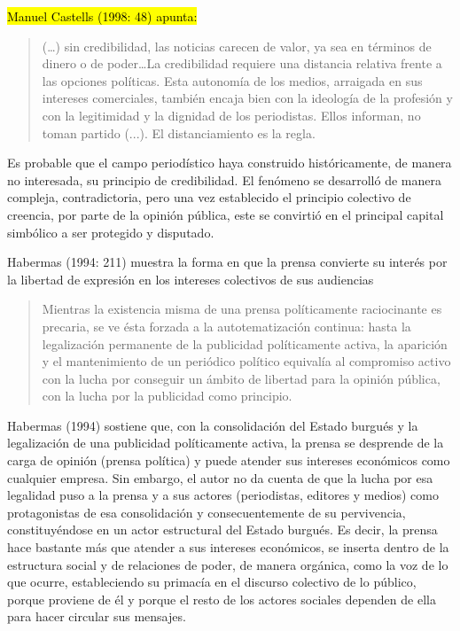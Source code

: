 %
%

\hl{Manuel Castells (1998: 48) apunta:}

\begin{quote}
(\ldots) sin credibilidad, las noticias carecen de valor, ya sea en términos de dinero o de poder\ldots La credibilidad requiere una distancia relativa frente a las opciones políticas. Esta autonomía de los medios, arraigada en sus intereses comerciales, también encaja bien con la ideología de la profesión y con la legitimidad y la dignidad de los periodistas. Ellos informan, no toman partido (...). El distanciamiento es la regla.
\end{quote}

Es probable que el campo periodístico haya construido históricamente, de manera no interesada, su principio de credibilidad. El fenómeno se desarrolló de manera compleja, contradictoria, pero una vez establecido el principio colectivo de creencia, por parte de la opinión pública, este se convirtió en el principal capital simbólico a ser protegido y disputado.

Habermas (1994: 211) muestra la forma en que la prensa convierte su interés por la libertad de expresión en los intereses colectivos de sus audiencias

\begin{quote}
Mientras la existencia misma de una prensa políticamente raciocinante es precaria, se ve ésta forzada a la autotematización continua: hasta la legalización permanente de la publicidad políticamente activa, la aparición y el mantenimiento de un periódico político equivalía al compromiso activo con la lucha por conseguir un ámbito de libertad para la opinión pública, con la lucha por la publicidad como principio.
\end{quote}

Habermas (1994) sostiene que, con la consolidación del Estado burgués y la legalización de una publicidad políticamente activa, la prensa se desprende de la carga de opinión (prensa política) y puede atender sus intereses económicos como cualquier empresa. Sin embargo, el autor no da cuenta de que la lucha por esa legalidad puso a la prensa y a sus actores (periodistas, editores y medios) como protagonistas de esa consolidación y consecuentemente de su pervivencia, constituyéndose en un actor estructural del Estado burgués. Es decir, la prensa hace bastante más que atender a sus intereses económicos, se inserta dentro de la estructura social y de relaciones de poder, de manera orgánica, como la voz de lo que ocurre, estableciendo su primacía en el discurso colectivo de lo público, porque proviene de él y porque el resto de los actores sociales dependen de ella para hacer circular sus mensajes.


